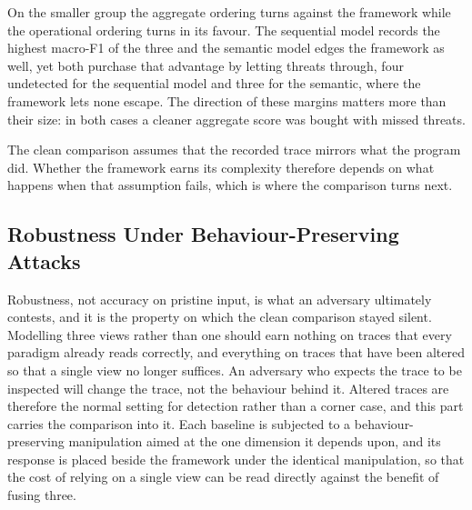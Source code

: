 \documentclass[%
    BCOR=10mm,
    DIV=13,
    toc=bibliography,
    toc=listof,
    oneside,
    12pt,
]{scrbook}
\begin{document}
On the smaller group the aggregate ordering turns against the framework while the
operational ordering turns in its favour. The sequential model records the highest
macro-F1 of the three and the semantic model edges the framework as well, yet both
purchase that advantage by letting threats through, four undetected for the
sequential model and three for the semantic, where the framework lets none escape.
The direction of these margins matters more than their size: in both cases a
cleaner aggregate score was bought with missed threats.

The clean comparison assumes that the recorded trace mirrors what the program
did. Whether the framework earns its complexity therefore depends on what
happens when that assumption fails, which is where the comparison turns next.

\subsection{Robustness Under Behaviour-Preserving Attacks}
\label{subsec:baseline_failure_modes}

Robustness, not accuracy on pristine input, is what an adversary ultimately
contests, and it is the property on which the clean comparison stayed silent.
Modelling three views rather than one should earn nothing on traces that every
paradigm already reads correctly, and everything on traces that have been altered
so that a single view no longer suffices. An adversary who expects the trace to be
inspected will change the trace, not the behaviour behind it. Altered traces are
therefore the normal setting for detection rather than a corner case, and this
part carries the comparison into it. Each baseline is subjected to a
behaviour-preserving manipulation aimed at the one dimension it depends upon, and
its response is placed beside the framework under
the identical manipulation, so that the cost of relying on a single view can be
read directly against the benefit of fusing three.
\end{document}
